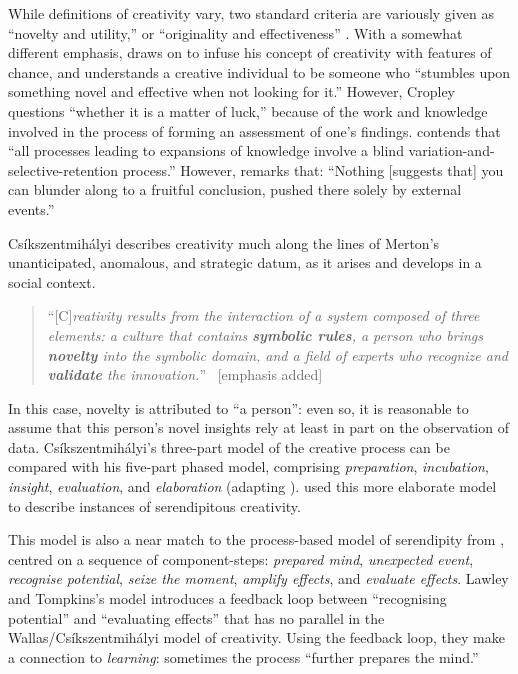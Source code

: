 While definitions of creativity vary, two standard criteria are
variously given as ``novelty and utility,'' or ``originality and
effectiveness'' \cite{newell:63,boden,runco2012standard}.  With a
somewhat different emphasis, \citet{cropley2006praise} draws on
\citet{austin1978chase} to infuse his concept of creativity with
features of chance, and understands a creative individual to be
someone who ``stumbles upon something novel and effective when not
looking for it.''  However, Cropley questions ``whether it is a matter
of luck,'' because of the work and knowledge involved in the process
of forming an assessment of one's findings.  \citet{campbell1960blind}
contends that ``all processes leading to expansions of knowledge involve
a blind variation-and-selective-retention process.''
However, \citet[p.~49]{austin1978chase} remarks that: ``Nothing [suggests that]
you can blunder along to a fruitful conclusion, pushed there solely by
external events.''

Cs\'ikszentmih\'alyi describes creativity much along the lines of
Merton's unanticipated, anomalous, and strategic datum, as it arises
and develops in a social context.

\begin{quote}
``{[}C{]}\emph{reativity results from the interaction of a system
    composed of three elements: a culture that contains
   \emph{\textbf{symbolic rules}}, a person who brings
    \emph{\textbf{novelty}} into the symbolic domain, and a
    field of experts who recognize and
    \emph{\textbf{validate}} the innovation.}''
  \cite[p.~6]{csikszentmihalyi1997flow}~{[}emphasis added{]}
\end{quote}

In this case, novelty is attributed to ``a person'': even so, it is
reasonable to assume that this person's novel insights rely at least
in part on the observation of data.
Cs\'ikszentmih\'alyi's three-part model of the creative process can be
compared with his five-part phased model, comprising
\emph{preparation}, \emph{incubation}, \emph{insight},
\emph{evaluation}, and \emph{elaboration}
\cite[pp.~79--80]{csikszentmihalyi1997flow} (adapting
\citet{wallas1926art}).  \citet{Campos2002} used this more elaborate
model to describe instances of serendipitous creativity.

This model is also a near match to the process-based model of
serendipity from \citet{lawley2008maximising}, centred on a sequence
of component-steps: \emph{prepared mind}, \emph{unexpected event},
\emph{recognise potential}, \emph{seize the moment}, \emph{amplify
  effects}, and \emph{evaluate effects}.  Lawley and Tompkins's model
introduces a feedback loop between ``recognising potential'' and
``evaluating effects'' that has no parallel in the
Wallas/Cs\'ikszentmih\'alyi model of creativity.  Using the feedback
loop, they make a connection to \emph{learning}: sometimes the process
``further prepares the mind.''

